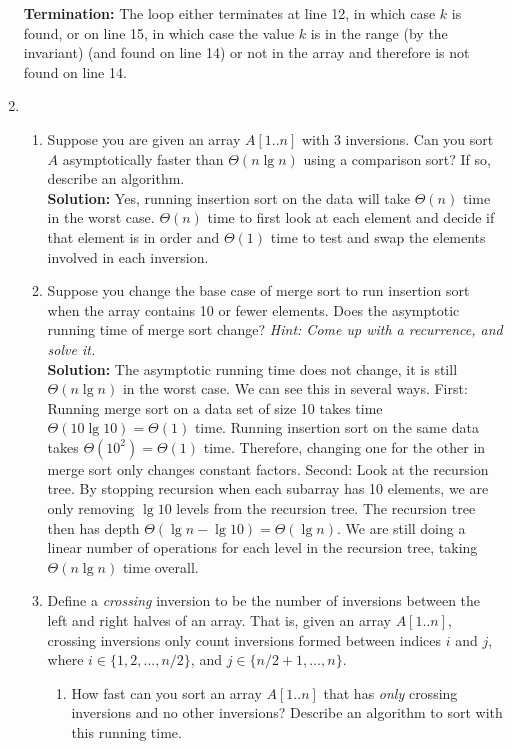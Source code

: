 \documentclass[letterpaper,11pt]{article}
\begin{document}
\begin{enumerate}
\textbf{Termination:} The loop either terminates at line 12, in which case $k$ is found, or on line 15, in which case the value $k$ is in the range (by the invariant) (and found on line 14) or not in the array and therefore is not found on line 14.
\else
\newpage
\fi{} %

\item\begin{enumerate}
\item Suppose you are given an array $A[1..n]$ with $3$ inversions. Can you sort $A$ asymptotically faster than $\Theta(n\lg n)$ using a comparison sort? If so, describe an algorithm.\\

{\bf Solution:} Yes, running insertion sort on the data will take $\Theta(n)$ time in the worst case. $\Theta(n)$ time to first look at each element and decide if that element is in order and $\Theta(1)$ time to test and swap the elements involved in each inversion.\\

\item Suppose you change the base case of merge sort to run insertion sort when the array contains 10 or fewer elements. Does the asymptotic running time of merge sort change? \emph{Hint: Come up with a recurrence, and solve it.} \\

{\bf Solution:} The asymptotic running time does not change, it is still $\Theta(n\lg n)$ in the worst case. We can see this in several ways. First: Running merge sort on a data set of size 10 takes time $\Theta(10\lg 10)=\Theta(1)$ time. Running insertion sort on the same data takes $\Theta(10^2)=\Theta(1)$ time. Therefore, changing one for the other in merge sort only changes constant factors. Second: Look at the recursion tree. By stopping recursion when each subarray has 10 elements, we are only removing $\lg 10$ levels from the recursion tree. The recursion tree then has depth $\Theta(\lg n -\lg 10) = \Theta(\lg n)$. We are still doing a linear number of operations for each level in the recursion tree, taking $\Theta(n\lg n)$ time overall.

\item Define a \emph{crossing} inversion to be the number of inversions between the left and right halves of an array. That is, given an array $A[1..n]$, crossing inversions only count inversions formed between indices $i$ and $j$, where $i \in \{1,2,\ldots,n/2\}$, and $j \in \{n/2+1,\ldots,n\}.$ 
\begin{enumerate}
\item How fast can you sort an array $A[1..n]$ that has \emph{only} crossing inversions and no other inversions? Describe an algorithm to sort with this running time.\\


\end{enumerate}
\end{enumerate}
\end{enumerate}
\end{document}
